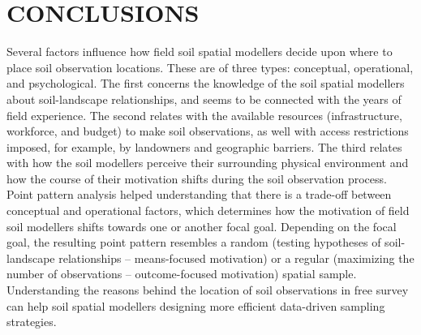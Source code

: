 \section{CONCLUSIONS}

Several factors influence how field soil spatial modellers decide upon where to place soil observation 
locations. 
These are of three types: conceptual, operational, and psychological. The first concerns the knowledge of the 
soil 
spatial modellers about soil-landscape relationships, and seems to be connected with the years of field 
experience. 
The second relates with the available resources (infrastructure, workforce, and budget) to make soil 
observations, 
as well with access restrictions imposed, for example, by landowners and geographic barriers. The third relates 
with 
how the soil modellers perceive their surrounding physical environment and how the course of their motivation 
shifts during the soil observation process. Point pattern analysis helped understanding that there is a 
trade-off 
between conceptual and operational factors, which determines how the motivation of field soil modellers shifts 
towards one or another focal goal. Depending on the focal goal, the resulting point pattern resembles a random 
(testing hypotheses of soil-landscape relationships -- means-focused motivation) or a regular (maximizing the 
number of observations -- outcome-focused motivation) spatial sample. Understanding the reasons behind the 
location of soil observations in free survey can help soil spatial modellers designing more efficient 
data-driven sampling strategies.

